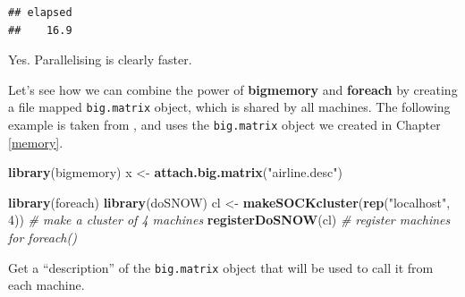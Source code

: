 \documentclass[]{book}
\newenvironment{Shaded}{\begin{snugshade}}{\end{snugshade}}
\newcommand{\CommentTok}[1]{\textcolor[rgb]{0.56,0.35,0.01}{\textit{#1}}}
\newcommand{\DataTypeTok}[1]{\textcolor[rgb]{0.13,0.29,0.53}{#1}}
\newcommand{\DecValTok}[1]{\textcolor[rgb]{0.00,0.00,0.81}{#1}}
\newcommand{\KeywordTok}[1]{\textcolor[rgb]{0.13,0.29,0.53}{\textbf{#1}}}
\newcommand{\NormalTok}[1]{#1}
\newcommand{\OperatorTok}[1]{\textcolor[rgb]{0.81,0.36,0.00}{\textbf{#1}}}
\newcommand{\OtherTok}[1]{\textcolor[rgb]{0.56,0.35,0.01}{#1}}
\newcommand{\StringTok}[1]{\textcolor[rgb]{0.31,0.60,0.02}{#1}}
\theoremstyle{definition}
\theoremstyle{definition}
\theoremstyle{definition}
\theoremstyle{remark}
\begin{document}
\begin{Shaded}
\end{Shaded}

\begin{verbatim}
## elapsed 
##    16.9
\end{verbatim}

Yes. Parallelising is clearly faster.

Let's see how we can combine the power of \textbf{bigmemory} and \textbf{foreach} by creating a file mapped \texttt{big.matrix} object, which is shared by all machines.
The following example is taken from \citet{kane2013scalable}, and uses the \texttt{big.matrix} object we created in Chapter \ref{memory}.

\begin{Shaded}
\begin{Highlighting}[]
\KeywordTok{library}\NormalTok{(bigmemory)}
\NormalTok{x <-}\StringTok{ }\KeywordTok{attach.big.matrix}\NormalTok{(}\StringTok{"airline.desc"}\NormalTok{)}

\KeywordTok{library}\NormalTok{(foreach)}
\KeywordTok{library}\NormalTok{(doSNOW)}
\NormalTok{cl <-}\StringTok{ }\KeywordTok{makeSOCKcluster}\NormalTok{(}\KeywordTok{rep}\NormalTok{(}\StringTok{"localhost"}\NormalTok{, }\DecValTok{4}\NormalTok{)) }\CommentTok{# make a cluster of 4 machines}
\KeywordTok{registerDoSNOW}\NormalTok{(cl) }\CommentTok{# register machines for foreach()}
\end{Highlighting}
\end{Shaded}

Get a ``description'' of the \texttt{big.matrix} object that will be used to call it from each machine.
\end{document}
